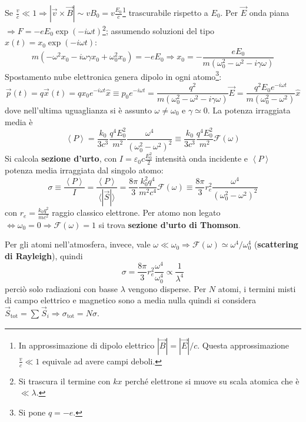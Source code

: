 \documentclass[10pt, a4paper]{scrartcl}
\numberwithin{equation}{subsection}
\theoremstyle{style1}
\begin{document}
Se $\frac{v}{c}\ll 1\Rightarrow \left\lvert \vec{v}\times \vec{B} \right\rvert \sim vB_0 = v \frac{E_0}{c}$\footnote{In approssimazione di dipolo elettrico $|\vec{B}| = |\vec{E}| / c$. Questa approssimazione $\frac{v}{c}\ll 1$ equivale ad avere campi deboli.} trascurabile rispetto a $E_0$. Per $\vec{E}$ onda piana $\Rightarrow F = - e E_0 \exp(-i\omega t)$\footnote{Si trascura il termine con $kx$ perch\'e elettrone si muove su scala atomica che \`e $\ll \lambda $.}; assumendo soluzioni del tipo $x(t) = x_0 \exp(-i\omega t) $:
\[
m(-\omega^2 x_0 - i\omega \gamma x_0  + \omega_0^2 x_0) = - e E_0 \Rightarrow x_0 = - \frac{eE_0}{ m(\omega^2_0 - \omega^2 - i\gamma\omega)}
\] 
Spostamento nube elettronica genera dipolo in ogni atomo\footnote{Si pone $q=-e$.}:
\begin{equation}
	\vec{p}(t) = q \vec{x}(t) = qx_0 e^{-i\omega t} \hat{ x}\equiv p_0 e^{-i\omega t} = \frac{q^2}{m(\omega_0^2 - \omega^2 - i \gamma\omega)} \vec{E} = \frac{q^2 E_0 e^{-i\omega t} }{m(\omega_0^2 - \omega^2)} \hat{ x}
\end{equation}
dove nell'ultima uguaglianza si \`e assunto $\omega\neq \omega_0$ e $\gamma\simeq 0$. La potenza irraggiata media \`e
\begin{equation}
	\left\langle P \right\rangle = \frac{k_0}{3c^3}\frac{q^4 E_0^2}{m^2}\frac{\omega^4}{(\omega_0^2 - \omega^2 ) ^2} \equiv\frac{k_0}{3c^3}\frac{q^4 E_0^2}{m^2} \mathcal{F}(\omega)
\end{equation}
Si calcola \textbf{sezione d'urto}, con $I = \varepsilon _0 c \frac{E_0^2}{2}$ intensit\`a onda incidente e $\left\langle P \right\rangle$ potenza media irraggiata dal singolo atomo:
\begin{equation}
	\sigma \equiv \frac{\left\langle P \right\rangle}{I} = \frac{\left\langle P \right\rangle}{\langle |\vec{S}| \rangle} = \frac{8\pi}{3}\frac{k_0^2 q^4}{m^2 c^4} \mathcal{F}(\omega) \equiv \frac{8\pi}{3}r_e^2 \frac{\omega^4}{(\omega_0^2-\omega^2)^2}
\end{equation}
con $r_e=\frac{k_0 q^2}{mc^2}$ raggio classico elettrone. Per atomo non legato $\iff\omega_0 = 0 \Rightarrow \mathcal{F}(\omega) = 1$ si trova \textbf{sezione d'urto di Thomson}. 

Per gli atomi nell'atmosfera, invece, vale $\omega \ll\omega_0\Rightarrow \mathcal{F}(\omega) \simeq \omega^4 / \omega_0^4$ (\textbf{scattering di Rayleigh}), quindi
\begin{equation}
	\sigma =\frac{8\pi}{3}r_e^2 \frac{\omega^4}{\omega^4_0}\propto \frac{1}{\lambda ^4}
\end{equation}
perci\`o solo radiazioni con basse $\lambda $ vengono disperse. Per $N$ atomi, i termini misti di campo elettrico e magnetico sono a media nulla quindi si considera $\vec{S}_\text{tot}= \sum_{}^{} \vec{S}_i\Rightarrow \sigma _\text{tot}=N \sigma $.
\end{document}
